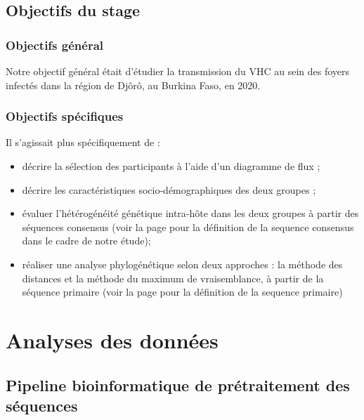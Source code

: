 \documentclass[a4paper,12pt]{article}
\begin{document}
\subsection{Objectifs du stage}

\subsubsection{Objectifs général }
Notre objectif général était d’étudier la transmission du VHC au sein des foyers infectés dans la région de Djôrô, au Burkina Faso, en 2020.
\subsubsection{Objectifs spécifiques }
Il s'agissait plus spécifiquement de :
\begin{itemize}
\item décrire la sélection des participants à l’aide d’un diagramme de flux ;
 \item décrire les caractéristiques socio-démographiques des deux groupes ;
 \item évaluer l’hétérogénéité génétique intra-hôte dans les deux groupes à partir des séquences consensus (voir la page \pageref{sec:analyse} pour la définition de la sequence consensus dans le cadre de notre étude);
 \item réaliser une analyse phylogénétique selon deux approches : la méthode des distances et la méthode du maximum de vraisemblance, à partir de la séquence primaire (voir la page \pageref{sec:analyse} pour la définition de la sequence primaire)
\end{itemize}

\newpage 

\section{Analyses des données}
\label{sec:analyse}

\subsection{Pipeline bioinformatique de prétraitement des séquences }
\end{document}
